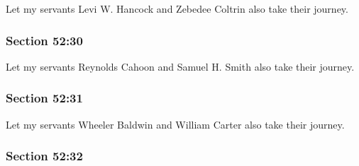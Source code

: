 		Let my servants Levi W. Hancock and Zebedee Coltrin also take their journey.


	\subsubsection{Section 52:30} %
		\label{DC52-30}

		Let my servants Reynolds Cahoon and Samuel H. Smith also take their journey.


	\subsubsection{Section 52:31} %
		\label{DC52-31}

		Let my servants Wheeler Baldwin and William Carter also take their journey.


	\subsubsection{Section 52:32} %
		\label{DC52-32}


